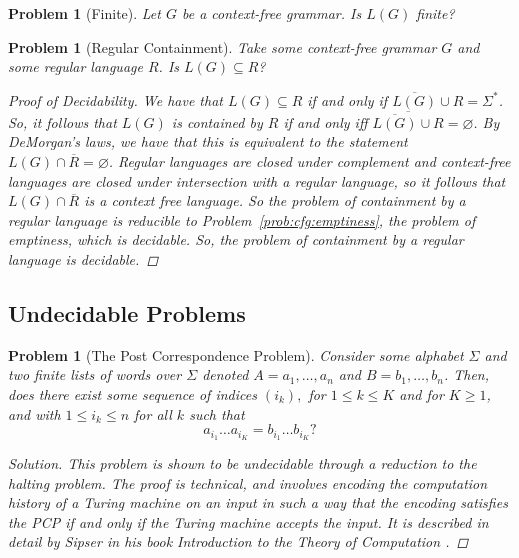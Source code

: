 \documentclass[psamsfonts]{amsart}
\newtheorem{prob}[thm]{Problem}
\theoremstyle{definition}
\theoremstyle{remark}
\numberwithin{equation}{section}
\begin{document}
\begin{prob}[Finite]
Let $G$ be a context-free grammar. Is $L(G)$ finite?
\end{prob}

\begin{prob}[Regular Containment]
Take some context-free grammar $G$ and some regular language $R$. Is
$L(G)\subseteq R$?
\begin{proof}[Proof of Decidability]
  We have that $L(G)\subseteq R$ if and only if
  $\overline{L(G)}\cup R = \Sigma^*$. So, it follows that $L(G)$ is contained by
  $R$ if and only iff $\overline{\overline{L(G)}\cup R} = \varnothing$. By
  DeMorgan's laws, we have that this is equivalent to the statement
  $L(G)\cap \overline{R} = \varnothing$. Regular languages are closed under
  complement and context-free languages are closed under intersection with a
  regular language, so it follows that $L(G)\cap \overline{R}$ is a context free
  language. So the problem of containment by a regular language is reducible to
  Problem~\ref{prob:cfg:emptiness}, the problem of emptiness, which is
  decidable. So, the problem of containment by a regular language is decidable.
\end{proof}

\end{prob}

\subsection{Undecidable Problems}
\begin{prob}[The Post Correspondence Problem]
  Consider some alphabet $\Sigma$ and two finite lists of words over $\Sigma$
  denoted $A = a_1,\dots,a_n$ and $B = b_1, \dots, b_n$. Then, does there exist
some sequence of indices $(i_k),$ for $1 \leq k \leq K$ and for
  $K\geq 1$, and with $1 \leq i_k \leq n$ for all $k$ such that
  \[
    a_{i_1}\dots a_{i_K} = b_{i_1}\dots b_{i_K}?
  \]
  \begin{proof}[Solution]
    This problem is shown to be undecidable through a reduction to the halting
    problem. The proof is technical, and involves encoding the computation
    history of a Turing machine on an input in such a way that the encoding satisfies the
    PCP if and only if the Turing machine accepts the input. It is described in
    detail by Sipser in his book \emph{Introduction to the Theory of Computation}
    \cite{sipser13:_introd_theor_comput}.
  \end{proof}
\end{prob}
\end{document}
